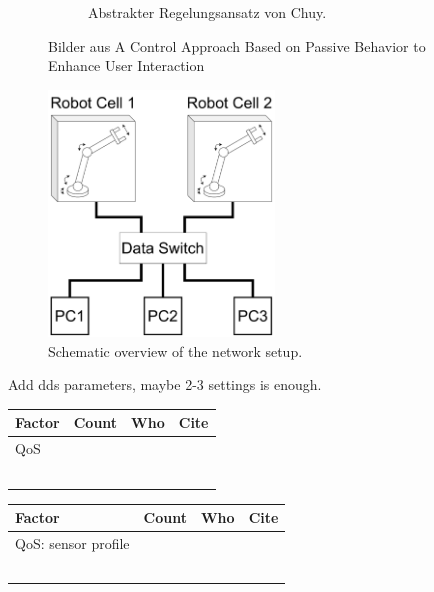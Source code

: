 \begin{figure}[htbp]
\begin{subfigure}[b]{0.4\textwidth}
	   	\caption{Abstrakter Regelungsansatz von Chuy.}
	   	\label{K2_chuy_control_P}
	   \end{subfigure}	
	\caption{Bilder aus \glqq A Control Approach Based on Passive Behavior
		to Enhance User Interaction \grqq{}\cite{chuy_07_approache}}
	\label{K2_chuy_robot_control_P}
\end{figure}

\begin{figure}
\includegraphics[width=6cm]{Figures/c6/network_setup.pdf}
\caption{Schematic overview of the network setup.} \label{c6_fig_network}
\end{figure}
Add dds parameters, maybe 2-3 settings is enough.
\begin{table}[htbp]
\centering
\begin{tabular}{|l|l|l|l|}
    \hline
Factor & Count & Who & Cite \\\hline
   QoS &     &  &    \\\hline
       &     &   &   \\\hline
       &     &   &   \\\hline
       &     &   &   \\\hline
       &     &   &   \\\hline
       &     &   &   \\\hline
\end{tabular}
\end{table}

\begin{table}[htbp]
    \centering
\begin{tabular}{|l|l|l|l|}
    \hline
Factor & Count & Who & Cite \\\hline
   QoS: sensor profile     &     &  &    \\\hline
       &     &   &   \\\hline
       &     &   &   \\\hline
       &     &   &   \\\hline
       &     &   &   \\\hline
       &     &   &   \\\hline
       
\end{tabular}
\end{table}


